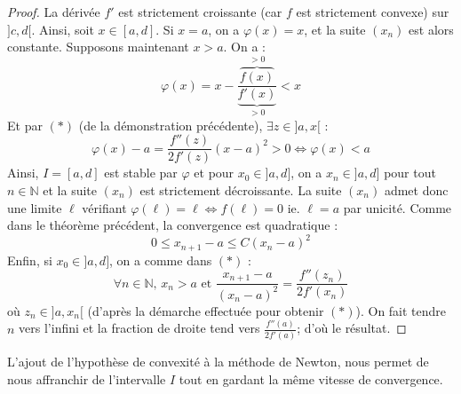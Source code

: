   \begin{proof}
    La dérivée $f'$ est strictement croissante (car $f$ est strictement convexe) sur $]c, d[$. Ainsi, soit $x \in [a, d]$. Si $x = a$, on a $\varphi(x) = x$, et la suite $(x_n)$ est alors constante. Supposons maintenant $x > a$. On a :
    \[ \varphi(x) = x - \frac{\overbrace{f(x)}^{> 0}}{\underbrace{f'(x)}_{> 0}} < x \]
    Et par $(*)$ (de la démonstration précédente), $\exists z \in ]a, x[$ :
    \[ \varphi(x) - a = \frac{f''(z)}{2f'(z)} (x-a)^2 > 0 \iff \varphi(x) < a \]
    Ainsi, $I = [a, d]$ est stable par $\varphi$ et pour $x_0 \in ]a, d]$, on a $x_n \in ]a, d]$ pour tout $n \in \mathbb{N}$ et la suite $(x_n)$ est strictement décroissante. La suite $(x_n)$ admet donc une limite $\ell$ vérifiant $\varphi(\ell) = \ell \iff f(\ell) = 0$ ie. $\ell = a$ par unicité. Comme dans le théorème précédent, la convergence est quadratique :
    \[ 0 \leq x_{n+1} - a \leq C (x_n - a)^2 \]
    Enfin, si $x_0 \in ]a, d]$, on a comme dans $(*)$ :
    \[ \forall n \in \mathbb{N}, \, x_n > a \text{ et } \frac{x_{n+1} - a}{(x_n - a)^2} = \frac{f''(z_n)}{2f'(x_n)} \]
    où $z_n \in ]a, x_n[$ (d'après la démarche effectuée pour obtenir $(*)$). On fait tendre $n$ vers l'infini et la fraction de droite tend vers $\frac{f''(a)}{2f'(a)}$; d'où le résultat.
  \end{proof}

  \begin{remark}
    L'ajout de l'hypothèse de convexité à la méthode de Newton, nous permet de nous affranchir de l'intervalle $I$ tout en gardant la même vitesse de convergence.
  \end{remark}

